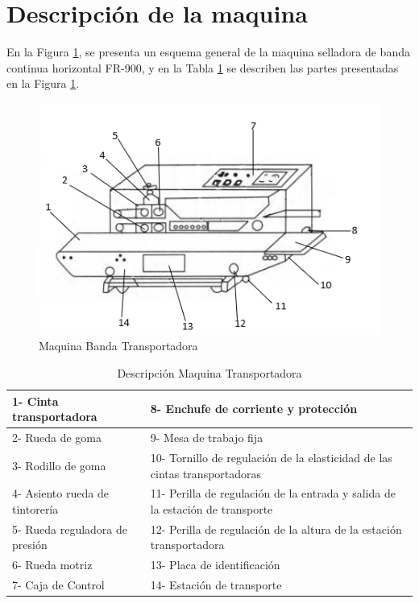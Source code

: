 	\section{Descripción de la maquina}
		En la Figura \ref{fig:Banda}, se presenta un esquema general de la maquina selladora de banda continua horizontal FR-900, y en la Tabla \ref{table:Banda} se describen las partes presentadas en la Figura \ref{fig:Banda}.
		\begin{figure}[ht]
			\centering
			\includegraphics[scale=0.95]{Figs/65.png}
			\caption{Maquina Banda Transportadora}
			\label{fig:Banda}
		\end{figure}
	
		\begin{table}[ht]
			\centering
			\begin{tabular}{|p{5cm}|p{8cm}|}
				\hline
				1- Cinta transportadora & 8- Enchufe de corriente y protección \\ 
				\hline
				2- Rueda de goma& 9- Mesa de trabajo fija\\
				\hline
				3- Rodillo de goma& 10- Tornillo de regulación de la elasticidad de las cintas transportadoras\\
				\hline
				4- Asiento rueda de tintorería& 11- Perilla de regulación de la entrada y salida de la estación de transporte\\
				\hline
				5- Rueda reguladora de presión& 12- Perilla de regulación de la altura de la estación transportadora\\
				\hline
				6- Rueda motriz& 13- Placa de identificación\\
				\hline
				7- Caja de Control& 14- Estación de transporte\\
				\hline
			\end{tabular}	
			\caption{Descripción Maquina Transportadora}
			\label{table:Banda}
		\end{table}

